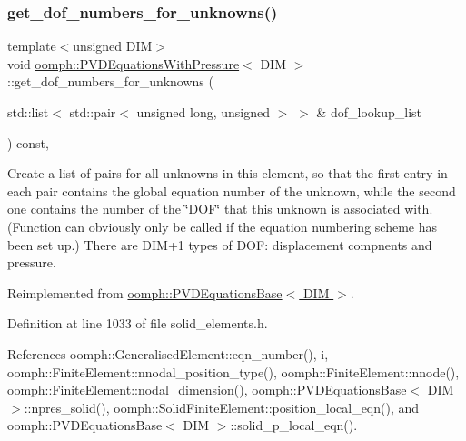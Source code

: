 \subsubsection{\texorpdfstring{get\+\_\+dof\+\_\+numbers\+\_\+for\+\_\+unknowns()}{get\_dof\_numbers\_for\_unknowns()}}
{\footnotesize\ttfamily template$<$unsigned D\+IM$>$ \\
void \hyperlink{classoomph_1_1PVDEquationsWithPressure}{oomph\+::\+P\+V\+D\+Equations\+With\+Pressure}$<$ D\+IM $>$\+::get\+\_\+dof\+\_\+numbers\+\_\+for\+\_\+unknowns (\begin{DoxyParamCaption}\item[{std\+::list$<$ std\+::pair$<$ unsigned long, unsigned $>$ $>$ \&}]{dof\+\_\+lookup\+\_\+list }\end{DoxyParamCaption}) const\hspace{0.3cm}{\ttfamily [inline]}, {\ttfamily [virtual]}}



Create a list of pairs for all unknowns in this element, so that the first entry in each pair contains the global equation number of the unknown, while the second one contains the number of the \char`\"{}\+D\+O\+F\char`\"{} that this unknown is associated with. (Function can obviously only be called if the equation numbering scheme has been set up.) There are D\+I\+M+1 types of D\+OF\+: displacement compnents and pressure. 



Reimplemented from \hyperlink{classoomph_1_1PVDEquationsBase_af17c01ce27e3a8aa21f86aaed70bc34e}{oomph\+::\+P\+V\+D\+Equations\+Base$<$ D\+I\+M $>$}.



Definition at line 1033 of file solid\+\_\+elements.\+h.



References oomph\+::\+Generalised\+Element\+::eqn\+\_\+number(), i, oomph\+::\+Finite\+Element\+::nnodal\+\_\+position\+\_\+type(), oomph\+::\+Finite\+Element\+::nnode(), oomph\+::\+Finite\+Element\+::nodal\+\_\+dimension(), oomph\+::\+P\+V\+D\+Equations\+Base$<$ D\+I\+M $>$\+::npres\+\_\+solid(), oomph\+::\+Solid\+Finite\+Element\+::position\+\_\+local\+\_\+eqn(), and oomph\+::\+P\+V\+D\+Equations\+Base$<$ D\+I\+M $>$\+::solid\+\_\+p\+\_\+local\+\_\+eqn().

\mbox{\label{classoomph_1_1PVDEquationsWithPressure_ad216a201134e2b239e3d5bcaedd56973}} 
